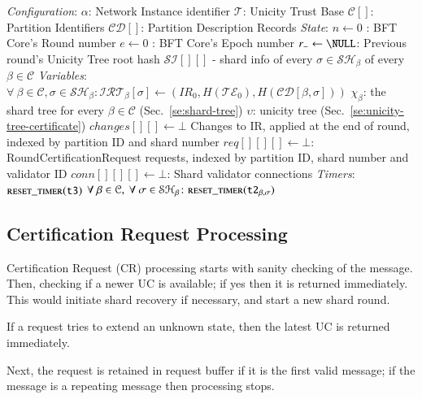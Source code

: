 \begin{algorithm}
  \caption{Global Parameters and Variables}\label{alg:globals}
  \begin{algorithmic}[0]
    \State \emph{Configuration}:
    \State $\alpha$: Network Instance identifier
    \State $\mathcal{T}$: Unicity Trust Base
    \State $\mathcal{C}[]$: Partition Identifiers
    \State $\mathcal{CD}[]$: Partition Description Records
    \State \emph{State}:
    \State $n \gets 0$ : BFT Core's Round number
    \State $e \gets 0$ : BFT Core's Epoch number
    \State $r_- \gets \NULL$: Previous round's Unicity Tree root hash
    \State $\mathcal{SI}[][]$ - shard info of every $\sigma\in\mathcal{SH}_\beta$ of every $\beta\in\mathcal{C}$
    \State \emph{Variables}:
    \State $\forall \ \beta\in\mathcal{C}, \sigma\in\mathcal{SH}_\beta \colon \mathcal{IRT}_\beta[\sigma] \gets (IR_0,H(\mathcal{TE}_0),H(\mathcal{CD}[\beta,\sigma]))$
    \State $\chi_\beta$: the shard tree for every $\beta\in\mathcal{C}$  (Sec.~\ref{se:shard-tree})
    \State $\upsilon$: unicity tree (Sec.~\ref{se:unicity-tree-certificate})
    \State $changes[][] \gets \bot$ Changes to IR, applied at the end of round, indexed by partition ID and shard number
    \State $req[][][] \gets \bot$: RoundCertificationRequest requests, indexed by partition ID, shard number and validator ID
    \State $conn[][][] \gets \bot$: Shard validator connections
    \State \emph{Timers}:
    \State $\Call{reset\_timer}{\texttt{t3}}$
    \State $\forall \ \beta\in\mathcal{C}, \ \forall \ \sigma\in\mathcal{SH}_\beta \colon  \Call{reset\_timer}{\texttt{t2}_{\beta, \sigma}}$
  \end{algorithmic}
\end{algorithm}


\subsection{Certification Request Processing}


Certification Request (CR) processing starts with sanity checking of the message. Then, checking if a newer UC is available; if yes then it is returned immediately. This would initiate shard recovery if necessary, and start a new shard round.

If a request tries to extend an unknown state, then the latest UC is returned immediately.

Next, the request is retained in request buffer if it is the first valid message; if the message is a repeating message then processing stops.


